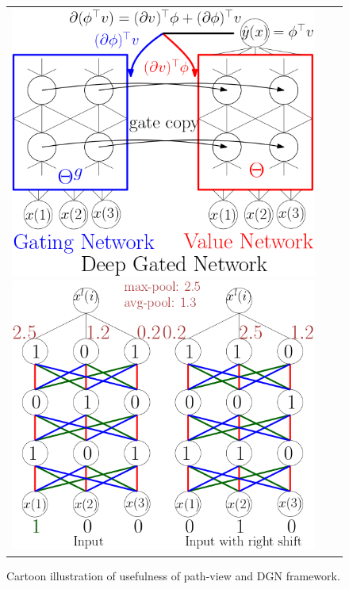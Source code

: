 \begin{figure}[t]
{\begin{tabular}{ccc}
\includegraphics[scale=0.5]{figs/nntwin-blck.png}
\includegraphics[scale=0.5]{figs/nnconv.png}
\end{tabular}
}
\caption{Cartoon illustration of usefulness of path-view and DGN framework.}
\label{fig:cartoon}
\end{figure}
